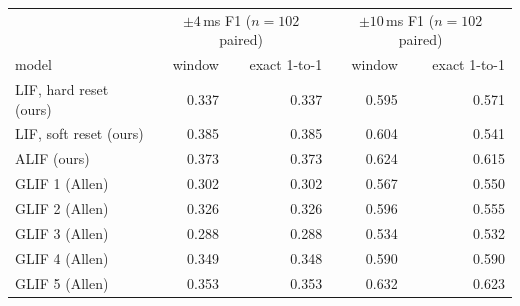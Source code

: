 \begin{tabular}{lrrrr}
\toprule
 & \multicolumn{2}{c}{$\pm 4$\,ms F1 ($n=102$ paired)} & \multicolumn{2}{c}{$\pm 10$\,ms F1 ($n=102$ paired)}\\
model & window & exact 1-to-1 & window & exact 1-to-1\\
\midrule
LIF, hard reset (ours) & 0.337 & 0.337 & 0.595 & 0.571\\
LIF, soft reset (ours) & 0.385 & 0.385 & 0.604 & 0.541\\
ALIF (ours) & 0.373 & 0.373 & 0.624 & 0.615\\
\midrule
GLIF 1 (Allen) & 0.302 & 0.302 & 0.567 & 0.550\\
GLIF 2 (Allen) & 0.326 & 0.326 & 0.596 & 0.555\\
GLIF 3 (Allen) & 0.288 & 0.288 & 0.534 & 0.532\\
GLIF 4 (Allen) & 0.349 & 0.348 & 0.590 & 0.590\\
GLIF 5 (Allen) & 0.353 & 0.353 & 0.632 & 0.623\\
\bottomrule
\end{tabular}
